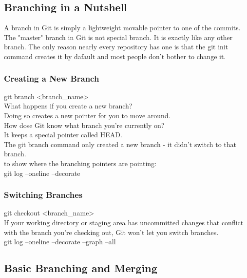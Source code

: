 \documentclass[11pt]{article}
\begin{document}
\subsection{Branching in a Nutshell}
\label{sec:orgcfb6bea}
A branch in Git is simply a lightweight movable pointer to one of the commits.\\

The "master" branch in Git is not special branch. It is exactly like any other branch. The only reason nearly every repository has one is that the git init command creates it by dafault and most people don't bother to change it.\\

\subsubsection{Creating a New Branch}
\label{sec:org1ef233d}
git branch <branch\_name>\\

What happens if you create a new branch?\\
Doing so creates a new pointer for you to move around.\\

How dose Git know what branch you're currently on?\\
It keeps a special pointer called HEAD.\\

The git branch command only created a new branch - it didn't switch to that branch.\\

to show where the branching pointers are pointing:\\
git log --oneline --decorate\\

\subsubsection{Switching Branches}
\label{sec:org3c4cc21}
git checkout <branch\_name>\\

If your working directory or staging area has uncommitted changes that conflict with the branch you're checking out, Git won't let you switch branches.\\


git log --oneline --decorate --graph --all\\


\subsection{Basic Branching and Merging}
\label{sec:org5a470e6}
\end{document}
